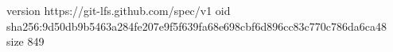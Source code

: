 version https://git-lfs.github.com/spec/v1
oid sha256:9d50db9b5463a284fe207e9f5f639fa68e698cbf6d896cc83c770c786da6ca48
size 849
